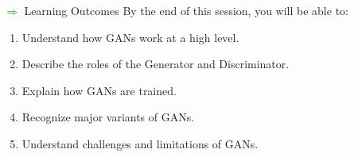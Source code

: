 \begin{frame}[allowframebreaks]{\textcolor{green}{$\Rightarrow$} Learning Outcomes}
    By the end of this session, you will be able to:
    \begin{enumerate}
        \item Understand how GANs work at a high level.
        \item Describe the roles of the Generator and Discriminator.
        \item Explain how GANs are trained.
        \item Recognize major variants of GANs.
        \item Understand challenges and limitations of GANs.
    \end{enumerate}
\end{frame}